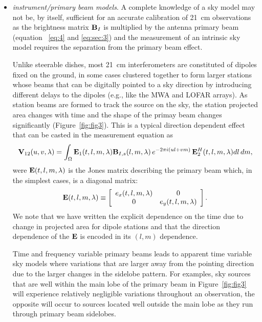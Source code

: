 \begin{itemize}
\item {\it instrument/primary beam models}. A complete knowledge of a sky model may not be, by itself, sufficient for an accurate calibration of 21~cm observations as the brightness matrix ${\bf B}_I$ is multiplied by the antenna primary beam (equation~ \ref{eq:4} and \ref{eq:sec:3}) and the measurement of an intrinsic sky model requires the separation from the primary beam effect. 

Unlike steerable dishes, most 21~cm interferometers are constituted of dipoles fixed on the ground, in some cases clustered together to form larger stations whose beams that can be digitally pointed to a sky direction by introducing different delays to the dipoles (e.g., like the MWA and LOFAR arrays). As station beams are formed to track the source on the sky, the station projected area changes with time and the shape of the primay beam changes significantly (Figure~\ref{fig:fig3}). This is a typical direction dependent effect that can be casted in the measurement equation as
\begin{equation}
{\bf V}_{12} (u,v,\lambda) = \int_\Omega {\bf E}_1 (t, l, m, \lambda) {\bf B}_{I,s} (l, m, \lambda) \, e^{-2 \pi i (ul + vm)} \, {\bf E}_2^H (t, l, m, \lambda)  dl \, dm,
\label{eq:sec:7_added_2}
\end{equation}
were ${\bf E} (t, l, m, \lambda)$ is the Jones matrix describing the primary beam which, in the simplest cases, is a diagonal matrix:
\begin{equation}
    {\bf E} (t, l, m, \lambda) \equiv 
    \left[
    \begin{array}{cc}
    e_x (t, l, m, \lambda) 	& 	0 	\\
    0 		& e_y (t, l, m, \lambda) 	\\
    \end{array}
    \right].
\label{eq:sec:4}
\end{equation} 
We note that we have written the explicit dependence on the time due to change in projected area for dipole stations and that the direction dependence of the ${\bf E}$ is encoded in its $(l, m)$ dependence.

Time and frequency variable primary beams leads to apparent time variable sky models where variations that are larger away from the pointing direction due to the larger changes in the sidelobe pattern. For examples, sky sources that are well within the main lobe of the primary beam in Figure~\ref{fig:fig3} will experience relatively negligible variations throughout an observation, the opposite will occur to sources located well outside the main lobe as they run through primary beam sidelobes.


\end{itemize}
